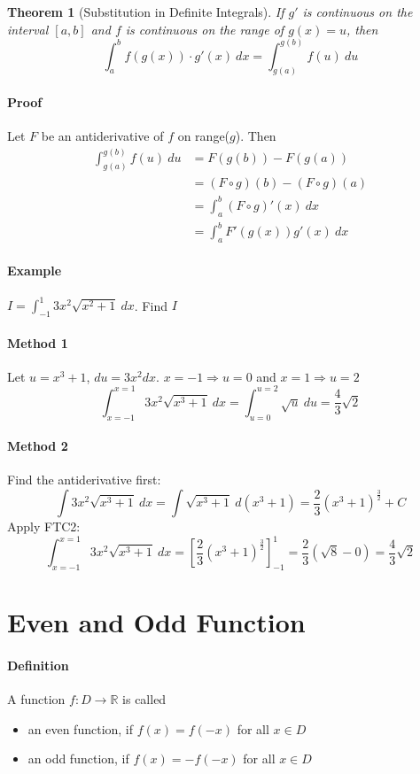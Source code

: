 \documentclass[12pt]{article}
\newtheorem{theorem}{Theorem}
\begin{document}
\begin{theorem}[Substitution in Definite Integrals]
     If $g'$ is continuous on the interval $[a, b]$ and $f$ is continuous on the range of $g(x) = u$, then 
     \[
         \int_a^b f(g(x))\cdot g'(x)\: dx = \int_{g(a)}^{g(b)} f(u)\: du
     \]
\end{theorem}

\paragraph{Proof}
Let $F$ be an antiderivative of $f$ on range($g$). Then 
\begin{align*} 
     \int_{g(a)}^{g(b)} f(u)\: du &= F(g(b)) - F(g(a)) \\
     &= (F \circ g)(b) - (F \circ g)(a) \\
     &= \int_{a}^{b} (F \circ g)'(x)\: dx \\
     &= \int_{a}^{b} F'(g(x))g'(x)\: dx
\end{align*}
\paragraph{Example} $I = \int_{-1}^{1} 3x^2 \sqrt{x^2 + 1}\: dx$. Find $I$
\paragraph{Method 1} Let $u = x^3 + 1$, $du = 3x^2 dx$. $x = -1 \Rightarrow u = 0$ and $x = 1 \Rightarrow u = 2$
\[
    \int_{x = - 1}^{x = 1} 3x^2 \sqrt{x^3 + 1}\: dx = \int_{u = 0}^{u = 2} \sqrt{u}\: du = \frac{4}{3} \sqrt{2}
\]
\paragraph{Method 2} Find the antiderivative first:
\[
    \int 3x^2 \sqrt{x^3 + 1}\: dx = \int \sqrt{x^3 + 1}\: d(x^3 + 1) = \frac{2}{3} (x^3 + 1)^{\frac{3}{2}} + C
\]
Apply FTC2:
\[
    \int_{x = - 1}^{x = 1} 3x^2 \sqrt{x^3 + 1}\: dx = \left[\frac{2}{3} (x^3 + 1)^{\frac{3}{2}}\right]^{1}_{ - 1} = \frac{2}{3} \left(\sqrt{8} - 0\right) = \frac{4}{3} \sqrt{2}
\]
\section{Even and Odd Function}
\paragraph{Definition}
A function $f : D \to \mathbb{R}$ is called
\begin{itemize} 
    \item an even function, if $f(x) = f(-x)$ for all $x \in D$
    \item an odd function, if $f(x) = -f(-x)$ for all $x \in D$
\end{itemize}
\end{document}
